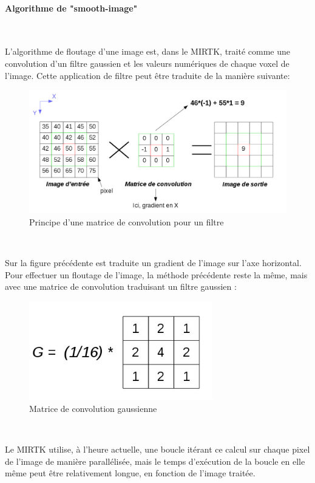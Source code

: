\documentclass[10pt]{report}
\begin{document}
	\paragraph{Algorithme de "smooth-image"}
~\par
	L'algorithme de floutage d'une image est, dans le MIRTK, traité comme une convolution d'un filtre gaussien et les valeurs numériques de chaque voxel de l'image. Cette application de filtre peut être traduite de la manière suivante:
	\begin{figure}[h!]
		\begin{center}
			\includegraphics[width=12cm]{convolve.jpg}
		\end{center}
		\caption{Principe d'une matrice de convolution pour un filtre}
		\label{Principe d'une matrice de convolution pour un filtre}
	\end{figure} ~\par
	Sur la figure précédente est traduite un gradient de l'image sur l'axe horizontal. Pour effectuer un floutage de l'image, la méthode précédente reste la même, mais avec une matrice de convolution traduisant un filtre gaussien :
	\begin{figure}[h!]
		\begin{center}
			\includegraphics[width=8cm]{matrix_gaussian.jpg}
		\end{center}
		\caption{Matrice de convolution gaussienne}
		\label{Matrice de convolution gaussienne}
	\end{figure} ~\par
	Le MIRTK utilise, à l'heure actuelle, une boucle itérant ce calcul sur chaque pixel de l'image de manière parallélisée, mais le temps d'exécution de la boucle en elle même peut être relativement longue, en fonction de l'image traitée. \\
\end{document}
